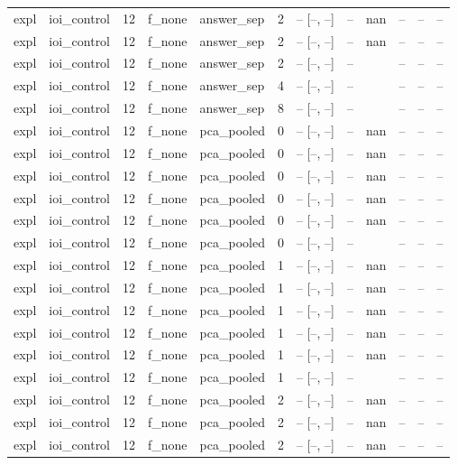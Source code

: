 \begin{tabular}{llrllrrrlrrr}
expl & ioi\_control & 12 & f\_none & answer\_sep & 2 & -- [--, --] & -- & nan & -- & -- & -- \\
expl & ioi\_control & 12 & f\_none & answer\_sep & 2 & -- [--, --] & -- & nan & -- & -- & -- \\
expl & ioi\_control & 12 & f\_none & answer\_sep & 2 & -- [--, --] & -- &  & -- & -- & -- \\
expl & ioi\_control & 12 & f\_none & answer\_sep & 4 & -- [--, --] & -- &  & -- & -- & -- \\
expl & ioi\_control & 12 & f\_none & answer\_sep & 8 & -- [--, --] & -- &  & -- & -- & -- \\
expl & ioi\_control & 12 & f\_none & pca\_pooled & 0 & -- [--, --] & -- & nan & -- & -- & -- \\
expl & ioi\_control & 12 & f\_none & pca\_pooled & 0 & -- [--, --] & -- & nan & -- & -- & -- \\
expl & ioi\_control & 12 & f\_none & pca\_pooled & 0 & -- [--, --] & -- & nan & -- & -- & -- \\
expl & ioi\_control & 12 & f\_none & pca\_pooled & 0 & -- [--, --] & -- & nan & -- & -- & -- \\
expl & ioi\_control & 12 & f\_none & pca\_pooled & 0 & -- [--, --] & -- & nan & -- & -- & -- \\
expl & ioi\_control & 12 & f\_none & pca\_pooled & 0 & -- [--, --] & -- &  & -- & -- & -- \\
expl & ioi\_control & 12 & f\_none & pca\_pooled & 1 & -- [--, --] & -- & nan & -- & -- & -- \\
expl & ioi\_control & 12 & f\_none & pca\_pooled & 1 & -- [--, --] & -- & nan & -- & -- & -- \\
expl & ioi\_control & 12 & f\_none & pca\_pooled & 1 & -- [--, --] & -- & nan & -- & -- & -- \\
expl & ioi\_control & 12 & f\_none & pca\_pooled & 1 & -- [--, --] & -- & nan & -- & -- & -- \\
expl & ioi\_control & 12 & f\_none & pca\_pooled & 1 & -- [--, --] & -- & nan & -- & -- & -- \\
expl & ioi\_control & 12 & f\_none & pca\_pooled & 1 & -- [--, --] & -- &  & -- & -- & -- \\
expl & ioi\_control & 12 & f\_none & pca\_pooled & 2 & -- [--, --] & -- & nan & -- & -- & -- \\
expl & ioi\_control & 12 & f\_none & pca\_pooled & 2 & -- [--, --] & -- & nan & -- & -- & -- \\
expl & ioi\_control & 12 & f\_none & pca\_pooled & 2 & -- [--, --] & -- & nan & -- & -- & -- \\

\end{tabular}
